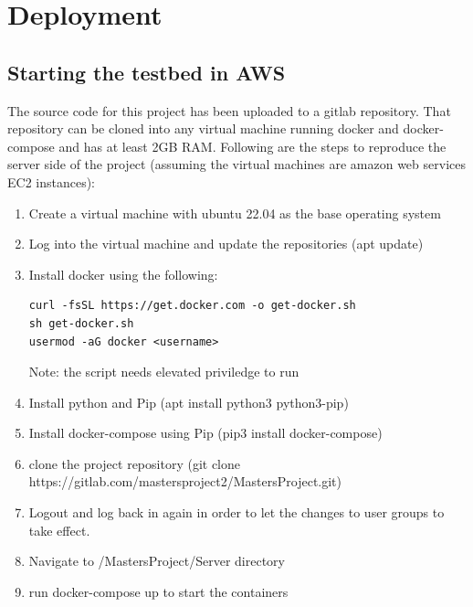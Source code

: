 \documentclass{article}
\begin{document}
\section{Deployment}
\subsection{Starting the testbed in AWS}
The source code for this project has been uploaded to a gitlab repository. That repository can be cloned into any virtual machine running docker and docker-compose and has at least 2GB RAM. Following are the steps to reproduce the server side of the project (assuming the virtual machines are amazon web services EC2 instances):
\begin{enumerate}
    \item Create a virtual machine with ubuntu 22.04 as the base operating system
    \item Log into the virtual machine and update the repositories (apt update)
    \item Install docker using the following:
    \begin{lstlisting}
curl -fsSL https://get.docker.com -o get-docker.sh
sh get-docker.sh
usermod -aG docker <username>
    \end{lstlisting}
    Note: the script needs elevated priviledge to run

    \item Install python and Pip (apt install python3 python3-pip)
    \item Install docker-compose using Pip (pip3 install docker-compose)
    \item clone the project repository (git clone https://gitlab.com/mastersproject2/MastersProject.git)
    \item Logout and log back in again in order to let the changes to user groups to take effect.
    \item Navigate to /MastersProject/Server directory
    \item run docker-compose up to start the containers
\end{enumerate}
\end{document}
